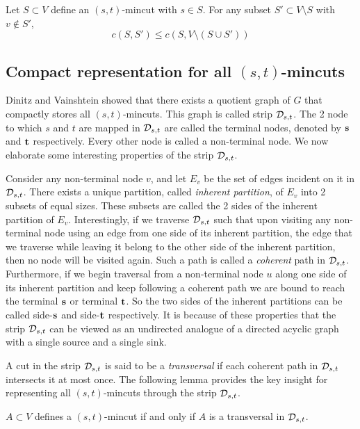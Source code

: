 \begin{lemma}
Let $S \subset V$ define an $(s,t)$-mincut with $s\in S$. For any subset $S'\subset V\setminus S$ with $v\notin S'$,
\[ 
c(S,S') \le c(S,V\setminus (S\cup S'))
\]
\label{lem:subset-property-of-min-cut}
\end{lemma}
\vspace{-10mm}
\subsection{Compact representation for all \texorpdfstring{$(s,t)$}{(s,t)}-mincuts}
Dinitz and Vainshtein \cite{DBLP:journals/siamcomp/DinitzV00} showed that there exists a quotient graph of $G$ that compactly stores all $(s,t)$-mincuts. This graph is called strip ${\cal D}_{s,t}$. The 2 node to which $s$ and $t$ are mapped in ${\cal D}_{s,t}$ are called the terminal nodes, denoted by ${\bf s}$ and ${\bf t}$ respectively. Every other node is called a non-terminal node. We now elaborate some interesting properties of the strip ${\cal D}_{s,t}$.

 Consider any non-terminal node $v$, and let $E_v$ be the set of edges incident on it in ${\cal D}_{s,t}$. There exists a unique partition, called {\em inherent partition}, of $E_v$ into 2 subsets of equal sizes. These subsets are called the 2 sides of the inherent partition of $E_v$. 
 Interestingly, if we traverse ${\cal D}_{s,t}$ such that upon visiting any non-terminal node using an edge from one side of its inherent partition, the edge that we traverse while leaving it belong to the other side of the inherent partition, then no node will be visited again. Such a path is called a {\em coherent} path in ${\cal D}_{s,t}$. Furthermore, if we begin traversal from a non-terminal node $u$ along one side of its inherent partition and keep following a coherent path we are bound to reach the terminal ${\bf s}$ or terminal ${\bf t}$. So the two sides of the inherent partitions can be called side-${\bf s}$
 and side-${\bf t}$ respectively.
It is because of these properties
that the strip ${\cal D}_{s,t}$ can be viewed as an undirected analogue of a directed acyclic graph with a single source and a single sink. 

A cut in the strip ${\cal D}_{s,t}$ is said to be a \textit{transversal} if each coherent path in ${\cal D}_{s,t}$ intersects it at most once. The following lemma provides the key insight for representing all $(s,t)$-mincuts through the strip ${\cal D}_{s,t}$.
\begin{lemma}
    $A\subset V$ defines a $(s,t)$-mincut if and only if $A$ is a transversal in ${\cal D}_{s,t}$.
    \label{lem:mincut-transversal}
\end{lemma}

